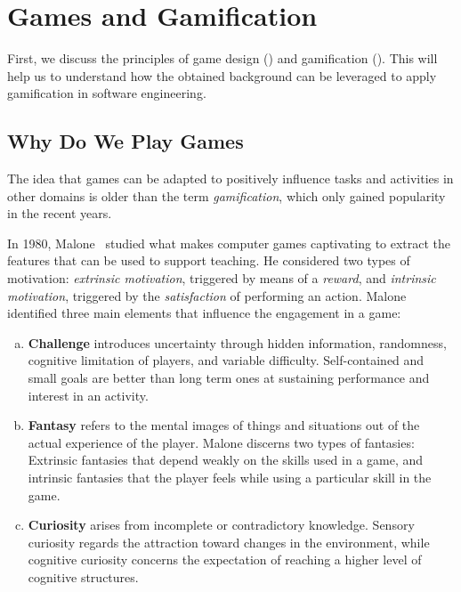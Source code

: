 \section{Games and Gamification} \label{sec:principles}

First, we discuss the principles of game design () and gamification (). This will help us to understand how the obtained background can be leveraged to apply gamification in software engineering.

\subsection{Why Do We Play Games} \label{sec:principles:games}

The  idea that games can be adapted to positively influence tasks and activities in other domains is older than the term \emph{gamification}, which only gained popularity in the recent years. 

In 1980, Malone~\cite{Malone1980} studied what makes computer games captivating to extract the features that can be used to support teaching. He considered two types of motivation: \emph{extrinsic motivation}, triggered by means of a {\em reward}, and \emph{intrinsic motivation}, triggered by the {\em satisfaction} of performing an action. Malone identified three main elements that influence the engagement in a game:

\begin{enumerate}[(a)]

\item\textbf{Challenge} introduces uncertainty through hidden information, randomness, cognitive limitation of players, and variable difficulty. Self-contained and small goals are better than long term ones at sustaining performance and interest in an activity.

\item\textbf{Fantasy} refers to the mental images of things and situations out of the actual experience of the player. Malone discerns two types of fantasies: Extrinsic fantasies that depend weakly on the skills used in a game, and intrinsic fantasies that the player feels while using a particular skill in the game.

\item\textbf{Curiosity} arises from incomplete or contradictory knowledge. Sensory curiosity regards the attraction toward changes in the environment, while cognitive curiosity concerns the expectation of reaching a higher level of cognitive structures.

\end{enumerate}

